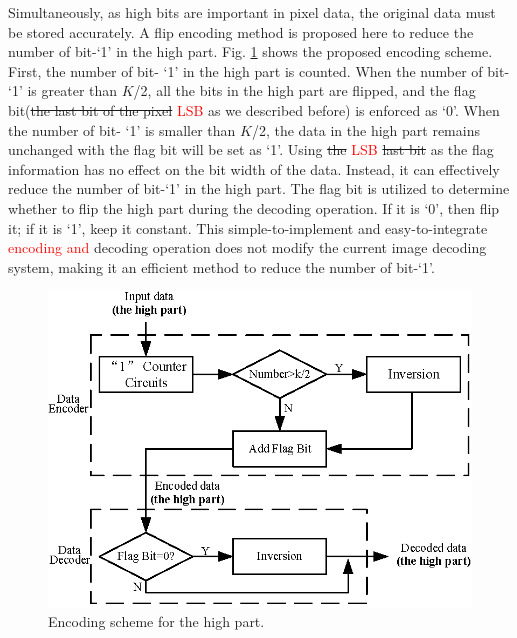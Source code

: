 \documentclass[lettersize,journal]{IEEEtran}
\begin{document}
Simultaneously, as high bits are important in pixel data, the original data must be stored accurately. A flip encoding method is proposed here to reduce the number of bit-`1' in the high part. Fig. \ref{fig3} shows the proposed encoding scheme. First, the number of bit- `1' in the high part is counted. When the number of bit- `1' is greater than $K$/2, all the bits in the high part are flipped, and the flag bit({\color{red}\sout{the last bit of the pixel}} \textcolor{red}{LSB} as we described before) is enforced as `0'. When the number of bit- `1' is smaller than $K$/2, the data in the high part remains unchanged with the flag bit will be set as `1'. Using {\color{red}\sout{the}} \textcolor{red}{LSB} {\color{red}\sout{last bit}} as the flag information has no effect on the bit width of the data. Instead, it can effectively reduce the number of bit-`1' in the high part. The flag bit is utilized to determine whether to flip the high part during the decoding operation. If it is `0', then flip it; if it is `1', keep it constant. This simple-to-implement and easy-to-integrate \textcolor{red}{encoding and} decoding operation does not modify the current image decoding system, making it an efficient method to reduce the number of bit-`1'.
\begin{figure}[htb]
	\centering
	\includegraphics[width=\linewidth]{Fig/Encoding scheme for the high part.png}
	\caption{Encoding scheme for the high part.}
	\label{fig3}
\end{figure}
\end{document}
